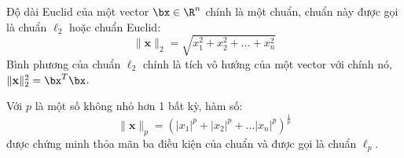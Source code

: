 
Độ dài Euclid của một vector $\bx \in \R^n$ chính là một chuẩn, chuẩn này
được gọi là chuẩn $\ell_2$ hoặc chuẩn Euclid:
\begin{equation}
    \label{eqn:norm2}
    \|\mathbf{x}\|_2 = \sqrt{x_1^2 + x_2^2 + \dots + x_n^2}
\end{equation}
Bình phương của chuẩn $\ell_2$ chính là tích vô hướng của một vector với chính nó,
$\|\mathbf{x}\|_2^2 = \bx^T\bx$.

\newpage Với $p$ {là một số không nhỏ hơn 1} bất kỳ, hàm số:
\begin{equation}
    \label{eqn:normp}
    \|\mathbf{x}\|_p = (|x_1|^p + |x_2|^p + \dots |x_n|^p)^{\frac{1}{p}}
\end{equation}
được chứng minh thỏa mãn ba điều kiện của chuẩn và được gọi là {chuẩn $\ell_p$}.
     



